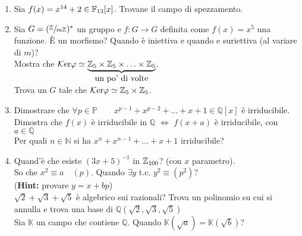 \documentclass[a4paper,11pt]{article}
\newcommand{\su}[2]{\sfrac{#1}{#2}}
\newcommand{\PP}{\mathbb{P}}
\newcommand{\QQ}{\mathbb{Q}}
\newcommand{\NN}{\mathbb{N}}
\newcommand{\KK}{\mathbb{K}}
\newcommand{\cart}{\times}
\newcommand{\tc}{\mbox{ t.c. }}
\newcommand{\Hint}{{\bf Hint: }}
\newcommand{\Ker}{\mathcal{K}\mbox{er} }
\begin{document}
\begin{enumerate}
\item Sia $f(x) = x^{14}+2 \in \FF{13}[x]$. Trovane il campo di spezzamento.
\item Sia $G = (\su{\ZZ{}}{m\ZZ{}})^*$ un gruppo e $f: G \rightarrow G$ definita come $f(x) = x^5$ una funzione. \`E un morfismo? Quando \`e iniettiva e quando e suriettiva (al variare di $m$)? \\ Mostra che $\Ker \varphi \simeq \underbrace{\ZZ{5}\cart\ZZ{5}\cart\ldots\cart\ZZ{5}}_{\mbox{un po' di volte}}$. \\ Trova un $G$ tale che $\Ker \varphi \simeq \ZZ{5}\cart\ZZ{5}$.
\item Dimostrare che $\forall p \in \PP \qquad x^{p-1}+x^{p-2}+\ldots+x+1 \in \QQ[x]$ \`e irriducibile. Dimostra che $f(x)$ \`e irriducibile in $\QQ$ $\Leftrightarrow$ $f(x+a)$ \`e irriducibile, con $a \in \QQ$ \\ Per quali $n \in \NN$ si ha $x^n+x^{n-1}+\ldots+x+1$ irriducibile?
\item Quand'\`e che esiste $(3x+5)^{-1}$ in $\ZZ{100}$? (con $x$ parametro). \\ So che $x^2 \equiv a \quad (p)$. Quando $\exists y \tc y^2 \equiv (p^2)$? \\ (\Hint provare $y=x+bp$) \\ $\sqrt{2}+\sqrt{3}+\sqrt{5}$ \`e algebrico sui razionali? Trova un polinomio su cui si annulla e trova una base di $\QQ(\sqrt{2}, \sqrt{3}, \sqrt{5})$ \\ Sia $\KK$ un campo che contiene $\QQ$. Quando $\KK(\sqrt{a}) = \KK(\sqrt{b})$?
\end{enumerate}
\end{document}
